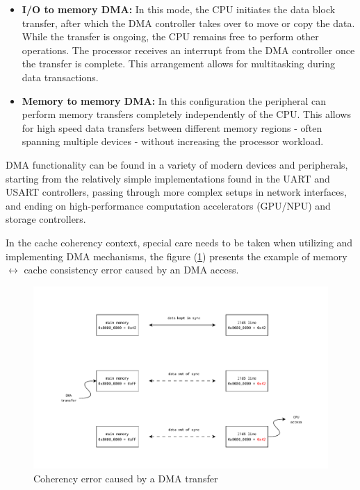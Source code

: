 \begin{itemize}
	\item \textbf{I/O to memory DMA:} In this mode, the CPU initiates the data block %
		transfer, after which the DMA controller takes over to move or copy the data.
		While the transfer is ongoing, the CPU remains free to perform other operations.
		The processor receives an interrupt from the DMA controller once the transfer is complete.
		This arrangement allows for multitasking during data transactions.
	\item \textbf{Memory to memory DMA:} In this configuration the peripheral can perform memory %
		transfers completely independently of the CPU. This allows for high speed data transfers
		between different memory regions - often spanning multiple devices - without increasing
		the processor workload.
\end{itemize}

\noindent DMA functionality can be found in a variety of modern devices and
peripherals, starting from the relatively simple implementations found in the
UART and USART controllers, passing through more complex setups in network %
interfaces, and ending on high-performance computation accelerators (GPU/NPU)
and storage controllers.

\noindent In the cache coherency context, special care needs to be %
taken when utilizing and implementing DMA mechanisms, the figure
(\ref{fig:dma_cache_issues}) presents the example of memory $\leftrightarrow$
cache consistency error caused by an DMA access.

\begin{figure}[h]
	\centering
	\includegraphics[width=\textwidth]{figures/02-background/dma_cache_issues.pdf}
	\caption{Coherency error caused by a DMA transfer}
	\label{fig:dma_cache_issues}
\end{figure}

